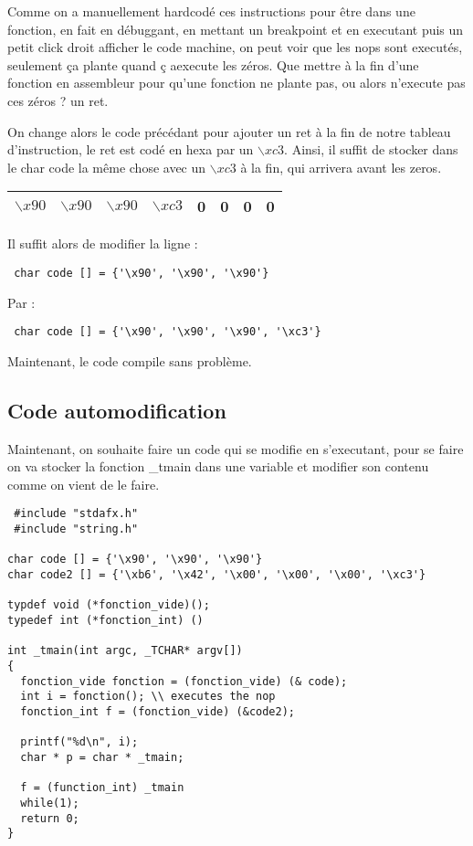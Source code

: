 \documentclass[a4paper,10pt]{article}
\begin{document}
Comme on a manuellement hardcodé ces instructions pour être dans une fonction, en fait en débuggant, en mettant un breakpoint et en executant puis un petit click droit afficher le code machine, on peut voir que les nops sont executés, seulement ça plante quand ç aexecute les zéros. Que mettre à la fin d'une fonction en assembleur pour qu'une fonction ne plante pas, ou alors n'execute pas ces zéros ? un ret.

On change alors le code précédant pour ajouter un ret à la fin de notre tableau d'instruction, le ret est codé en hexa par un $\backslash xc3$. Ainsi, il suffit de stocker dans le char code la même chose avec un $\backslash xc3$ à la fin, qui arrivera avant les zeros.

 \begin{center}
\begin{tabular}{ |c|c|c|c|c|c|c|c|}
\hline
 $\backslash x90 $& $\backslash x90 $& $\backslash x90 $& $\backslash xc3$ & 0 & 0 & 0 & 0\\ 
\hline
\end{tabular}
\end{center}

Il suffit alors de modifier la ligne :

\begin{lstlisting}
 char code [] = {'\x90', '\x90', '\x90'}
\end{lstlisting}

Par : 


\begin{lstlisting}
 char code [] = {'\x90', '\x90', '\x90', '\xc3'}
\end{lstlisting}

Maintenant, le code compile sans problème.

\subsection{Code automodification}
Maintenant, on souhaite faire un code qui se modifie en s'executant, pour se faire on va stocker la fonction \_tmain dans une variable et modifier son contenu comme on vient de le faire.

\begin{lstlisting}
 #include "stdafx.h"
 #include "string.h"

char code [] = {'\x90', '\x90', '\x90'}
char code2 [] = {'\xb6', '\x42', '\x00', '\x00', '\x00', '\xc3'}

typdef void (*fonction_vide)();
typedef int (*fonction_int) ()

int _tmain(int argc, _TCHAR* argv[])
{
  fonction_vide fonction = (fonction_vide) (& code);
  int i = fonction(); \\ executes the nop
  fonction_int f = (fonction_vide) (&code2);
  
  printf("%d\n", i);
  char * p = char * _tmain;
  
  f = (function_int) _tmain
  while(1);
  return 0;
}
\end{lstlisting}
\end{document}
